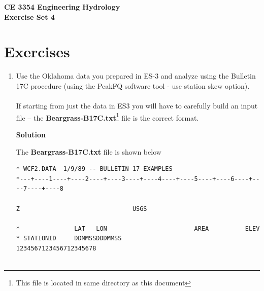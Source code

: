 \documentclass[12pt]{article}
\begin{document}
\begin{center}
{\textbf{{ CE 3354 Engineering Hydrology} \\ {Exercise Set 4}}}
\end{center}

\section*{\small{Exercises}}
\begin{enumerate}
\item Use the Oklahoma data you prepared in ES-3 and analyze using the Bulletin 17C procedure (using the PeakFQ software tool - use station skew option).   \\~\\ If starting from just the data in ES3 you will have to carefully build an input file -- the \textbf{Beargrass-B17C.txt}\footnote{This file is located in same directory as this document} file is the correct format. 

\textbf{Solution}

The \textbf{Beargrass-B17C.txt} file is shown below

\begin{verbatim}
* WCF2.DATA  1/9/89 -- BULLETIN 17 EXAMPLES
*---+----1----+----2----+----3----+----4----+----5----+----6----+----7----+----8

Z                               USGS

*               LAT   LON                        AREA          ELEV
* STATIONID     DDMMSSDDDMMSS                    1234567123456712345678


\end{verbatim}
\end{enumerate}
\end{document}
